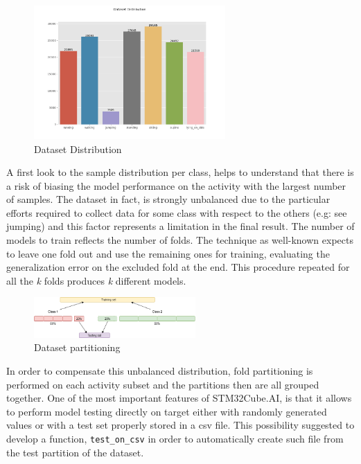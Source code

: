 \begin{figure}
	\vspace{-20pt}
	\hfill\includegraphics[width=0.65\textwidth]{figures/data_dist.png}\hspace*{\fill}
	\caption{Dataset Distribution}\label{fig:16}
	\centering
\end{figure}
A first look to the sample distribution per class, helps to understand that there is a risk of biasing the model performance on the activity with the largest number of samples. The dataset in fact, is strongly unbalanced due to the particular efforts required to collect data for some class with respect to the others (e.g: see jumping) and this factor represents a limitation in the final result.\newline
The number of models to train reflects the number of folds. The technique as well-known expects to leave one fold out and use the remaining ones for training, evaluating the generalization error on the excluded fold at the end. This procedure repeated for all the \textit{k} folds produces \textit{k} different models. \\
\par
\begin{figure}
	\hfill\includegraphics[width=0.55\textwidth]{figures/k_fold_part.png}\hspace*{\fill}
	\caption{Dataset partitioning}\label{fig:17}
	\centering
\end{figure}
In order to compensate this unbalanced distribution, fold partitioning is performed on each activity subset and the partitions then are all grouped together. \newline
One of the most important features of STM32Cube.AI, is that it allows to perform model testing directly on target either with randomly generated values or with a test set properly stored in a csv file. This possibility suggested to develop a function, \texttt{test_on_csv} in order to automatically create such file from the test partition of the dataset. \newline
